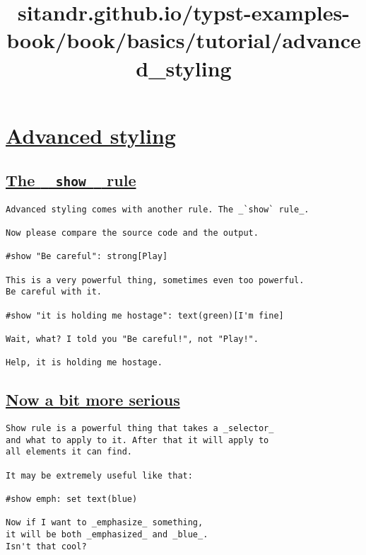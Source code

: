\title{sitandr.github.io/typst-examples-book/book/basics/tutorial/advanced_styling}

\section{\texorpdfstring{\hyperref[advanced-styling]{Advanced
styling}}{Advanced styling}}\label{advanced-styling}

\subsection{\texorpdfstring{\hyperref[the-show-rule]{The
\texttt{\ }{\texttt{\ show\ }}\texttt{\ }
rule}}{The   show   rule}}\label{the-show-rule}

\begin{verbatim}
Advanced styling comes with another rule. The _`show` rule_.

Now please compare the source code and the output.

#show "Be careful": strong[Play]

This is a very powerful thing, sometimes even too powerful.
Be careful with it.

#show "it is holding me hostage": text(green)[I'm fine]

Wait, what? I told you "Be careful!", not "Play!".

Help, it is holding me hostage.
\end{verbatim}

\pandocbounded{}

\subsection{\texorpdfstring{\hyperref[now-a-bit-more-serious]{Now a bit
more serious}}{Now a bit more serious}}\label{now-a-bit-more-serious}

\begin{verbatim}
Show rule is a powerful thing that takes a _selector_
and what to apply to it. After that it will apply to
all elements it can find.

It may be extremely useful like that:

#show emph: set text(blue)

Now if I want to _emphasize_ something,
it will be both _emphasized_ and _blue_.
Isn't that cool?
\end{verbatim}

